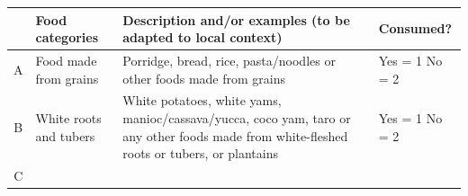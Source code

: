 \documentclass[12pt,]{book}
\theoremstyle{definition}
\theoremstyle{definition}
\theoremstyle{definition}
\theoremstyle{remark}
\begin{document}
\begin{longtable}[]{@{}clll@{}}
\toprule
\begin{minipage}[b]{0.05\columnwidth}\centering
\strut
\end{minipage} & \begin{minipage}[b]{0.18\columnwidth}\raggedright
\textbf{Food categories}\strut
\end{minipage} & \begin{minipage}[b]{0.54\columnwidth}\raggedright
\textbf{Description and/or examples (to be adapted to local
context)}\strut
\end{minipage} & \begin{minipage}[b]{0.12\columnwidth}\raggedright
\textbf{Consumed?}\strut
\end{minipage}\tabularnewline
\midrule
\endhead
\begin{minipage}[t]{0.05\columnwidth}\centering
A\strut
\end{minipage} & \begin{minipage}[t]{0.18\columnwidth}\raggedright
Food made from grains\strut
\end{minipage} & \begin{minipage}[t]{0.54\columnwidth}\raggedright
Porridge, bread, rice, pasta/noodles or other foods made from
grains\strut
\end{minipage} & \begin{minipage}[t]{0.12\columnwidth}\raggedright
Yes = 1 No = 2\strut
\end{minipage}\tabularnewline
\begin{minipage}[t]{0.05\columnwidth}\centering
B\strut
\end{minipage} & \begin{minipage}[t]{0.18\columnwidth}\raggedright
White roots and tubers\strut
\end{minipage} & \begin{minipage}[t]{0.54\columnwidth}\raggedright
White potatoes, white yams, manioc/cassava/yucca, coco yam, taro or any
other foods made from white-fleshed roots or tubers, or plantains\strut
\end{minipage} & \begin{minipage}[t]{0.12\columnwidth}\raggedright
Yes = 1 No = 2\strut
\end{minipage}\tabularnewline
\begin{minipage}[t]{0.05\columnwidth}\centering
C\strut
\end{minipage} & \begin{minipage}[t]{0.18\columnwidth}\raggedright

\end{minipage}
\end{longtable}
\end{document}
